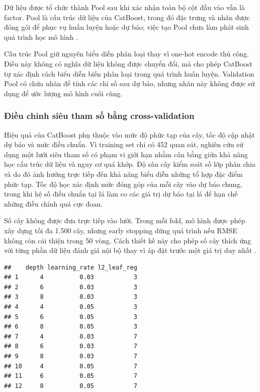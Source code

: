 Dữ liệu được tổ chức thành Pool sau khi xác nhận toàn bộ cột đầu vào vẫn
là factor. Pool là cấu trúc dữ liệu của CatBoost, trong đó đặc trưng và
nhãn được đóng gói để phục vụ huấn luyện hoặc dự báo; việc tạo Pool chưa
làm phát sinh quá trình học mô hình \cite{catboost_docs}.

Cấu trúc Pool giữ nguyên biểu diễn phân loại thay vì one-hot encode thủ
công. Điều này không có nghĩa dữ liệu không được chuyển đổi, mà cho phép
CatBoost tự xác định cách biểu diễn biến phân loại trong quá trình huấn
luyện. Validation Pool có chứa nhãn để tính các chỉ số sau dự báo, nhưng
nhãn này không được sử dụng để ước lượng mô hình cuối cùng.

\subsubsection{Điều chỉnh siêu tham số bằng
cross-validation}\label{nghi:ux111iux1ec1u-chux1ec9nh-siuxeau-tham-sux1ed1-bux1eb1ng-cross-validation}

Hiệu quả của CatBoost phụ thuộc vào mức độ phức tạp của cây, tốc độ cập
nhật dự báo và mức điều chuẩn. Vì training set chỉ có 452 quan sát,
nghiên cứu sử dụng một lưới siêu tham số có phạm vi giới hạn nhằm cân
bằng giữa khả năng học cấu trúc dữ liệu và nguy cơ quá khớp. Độ sâu cây
kiểm soát số lớp phân chia và do đó ảnh hưởng trực tiếp đến khả năng
biểu diễn những tổ hợp đặc điểm phức tạp. Tốc độ học xác định mức đóng
góp của mỗi cây vào dự báo chung, trong khi hệ số điều chuẩn tại lá làm
co các giá trị dự báo tại lá để hạn chế những điều chỉnh quá cực đoan.

Số cây không được đưa trực tiếp vào lưới. Trong mỗi fold, mô hình được
phép xây dựng tối đa 1.500 cây, nhưng early stopping dừng quá trình nếu
RMSE không còn cải thiện trong 50 vòng. Cách thiết kế này cho phép số
cây thích ứng với từng phần dữ liệu đánh giá nội bộ thay vì áp đặt trước
một giá trị duy nhất \cite{catboost_docs}.

\begin{verbatim}
##    depth learning_rate l2_leaf_reg
## 1      4          0.03           3
## 2      6          0.03           3
## 3      8          0.03           3
## 4      4          0.05           3
## 5      6          0.05           3
## 6      8          0.05           3
## 7      4          0.03           7
## 8      6          0.03           7
## 9      8          0.03           7
## 10     4          0.05           7
## 11     6          0.05           7
## 12     8          0.05           7
\end{verbatim}

